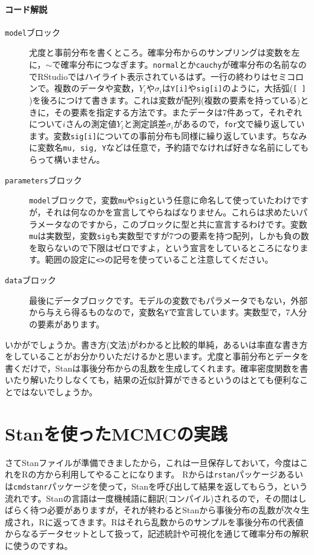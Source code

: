 \documentclass{ltjsbook}
\begin{document}
\paragraph{コード解説}
\begin{description}
        \item[\texttt{model}ブロック] 尤度と事前分布を書くところ。確率分布からのサンプリングは変数を左に，$\sim$で確率分布につなぎます。\texttt{normal}とか\texttt{cauchy}が確率分布の名前なのでRStudioではハイライト表示されているはず。一行の終わりはセミコロンで。複数のデータや変数，$Y_i$や$\sigma_i$は\verb|Y[i]|や\verb|sig[i]|のように，大括弧(\verb|[ ]| )を後ろにつけて書きます。これは変数が配列(複数の要素を持っている)ときに，その要素を指定する方法です。またデータは7件あって，それぞれについて$i$さんの測定値$Y_i$と測定誤差$\sigma_i$があるので，\texttt{for}文で繰り返しています。変数\verb|sig[i]|についての事前分布も同様に繰り返しています。ちなみに変数名\texttt{mu, sig, Y}などは任意で，予約語でなければ好きな名前にしてもらって構いません。
        \item[\texttt{parameters}ブロック] \texttt{model}ブロックで，変数\texttt{mu}や\texttt{sig}という任意に命名して使っていたわけですが，それは何なのかを宣言してやらねばなりません。これらは求めたいパラメータなのですから，このブロックに型と共に宣言するわけです。変数\verb|mu|は実数型，変数\verb|sig|も実数型ですが7つの要素を持つ配列，しかも負の数を取らないので下限はゼロですよ，という宣言をしているところになります。範囲の設定に\verb|<>|の記号を使っていること注意してください。 
        \item[\texttt{data}ブロック] 最後にデータブロックです。モデルの変数でもパラメータでもない，外部から与えら得るものなので，変数名\verb|Y|で宣言しています。実数型で，7人分の要素があります。
\end{description}

いかがでしょうか。書き方(文法)がわかると比較的単純，あるいは率直な書き方をしていることがお分かりいただけるかと思います。尤度と事前分布とデータを書くだけで，Stanは事後分布からの乱数を生成してくれます。確率密度関数を書いたり解いたりしなくても，結果の近似計算ができるというのはとても便利なことではないでしょうか。
\section{Stanを使ったMCMCの実践}
さてStanファイルが準備できましたから，これは一旦保存しておいて，今度はこれをRの方から利用してやることになります。
Rからは\texttt{rstan}パッケージあるいは\texttt{cmdstanr}パッケージを使って，Stanを呼び出して結果を返してもらう，という流れです。Stanの言語は一度機械語に翻訳(コンパイル)されるので，その間はしばらく待つ必要がありますが，それが終わるとStanから事後分布の乱数が次々生成され，Rに返ってきます。Rはそれら乱数からのサンプルを事後分布の代表値からなるデータセットとして扱って，記述統計や可視化を通じて確率分布の解釈に使うのですね。
\end{document}
